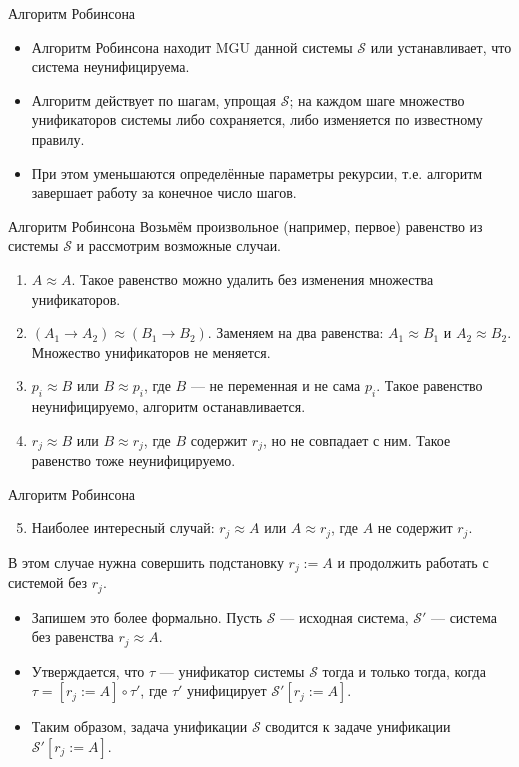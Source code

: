 \documentclass[xcolor=dvipsnames]{beamer}
\newcommand{\Sc}{\mathcal{S}}
\begin{document}
\begin{frame}{Алгоритм Робинсона}

\begin{itemize}[<+->]
 \item Алгоритм Робинсона находит MGU данной системы $\Sc$ или устанавливает, что система неунифицируема.
 \item Алгоритм действует по шагам, упрощая $\Sc$; на каждом шаге множество унификаторов системы либо сохраняется, либо изменяется по известному правилу.
 \item При этом уменьшаются определённые параметры рекурсии, т.е. алгоритм завершает работу за конечное число шагов.
\end{itemize}


\end{frame}

\begin{frame}{Алгоритм Робинсона}
Возьмём произвольное (например, первое) равенство из системы $\Sc$ и рассмотрим возможные случаи.
 \begin{enumerate}
  \item<2-> $A \approx A$. Такое равенство можно удалить без изменения множества унификаторов.
  \item<3-> $(A_1 \to A_2) \approx (B_1 \to B_2)$. Заменяем на два равенства: $A_1 \approx B_1$ и $A_2 \approx B_2$. Множество унификаторов не меняется.
  \item<4-> $p_i \approx B$ или $B \approx p_i$, где $B$ --- не переменная и не сама $p_i$. Такое равенство неунифицируемо, алгоритм останавливается.
  \item<5-> $r_j \approx B$ или $B \approx r_j$, где $B$ содержит $r_j$, но не совпадает с ним. Такое равенство тоже неунифицируемо.
 \end{enumerate}

\end{frame}

\begin{frame}{Алгоритм Робинсона}

\begin{enumerate}\setcounter{enumi}{4}
 \item Наиболее интересный случай: $r_j \approx A$ или $A \approx r_j$, где $A$ не содержит $r_j$.
\end{enumerate}

 В этом случае нужна совершить подстановку $r_j := A$ и продолжить работать с системой без $r_j$.
 
 \begin{itemize}
  \item<2-> Запишем это более формально. Пусть $\Sc$ --- исходная система, $\Sc'$ --- система без равенства $r_j \approx A$.
  \item<3-> Утверждается, что $\tau$ --- унификатор системы $\Sc$ тогда и только тогда, когда $\tau = [r_j := A] \circ \tau'$, где $\tau'$ унифицирует $\Sc'[r_j := A]$. 
  \item<4-> Таким образом, задача унификации $\Sc$ сводится к задаче унификации $\Sc'[r_j := A]$.
 \end{itemize}

\end{frame}
\end{document}
